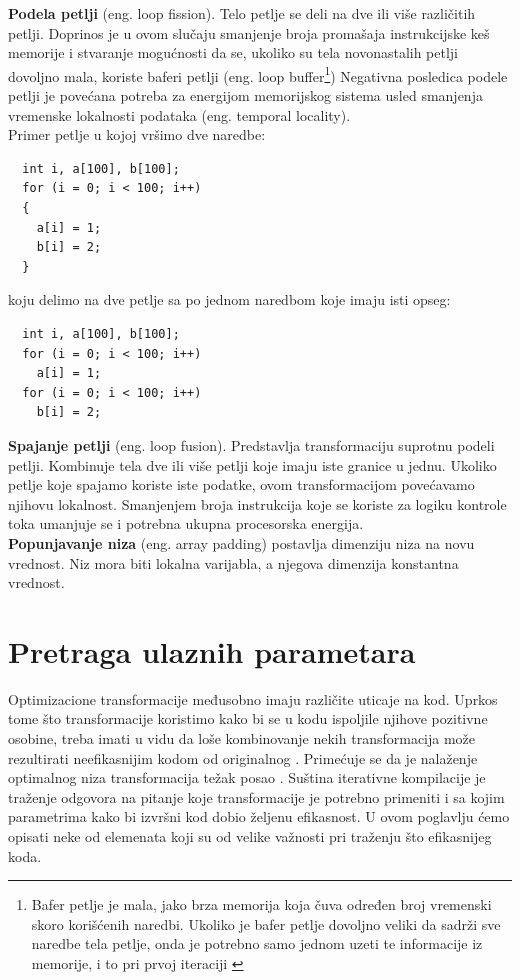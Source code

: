 \documentclass[a4paper]{article}
\begin{document}
\textbf{Podela petlji} (eng. loop fission). Telo petlje se deli na dve ili više različitih petlji. 
Doprinos je u ovom slučaju smanjenje broja promašaja instrukcijske keš memorije i stvaranje mogućnosti da se, 
ukoliko su tela novonastalih petlji dovoljno mala, 
koriste baferi petlji (eng. loop buffer\footnote{Bafer petlje je mala, jako brza memorija koja čuva određen broj vremenski skoro korišćenih naredbi. Ukoliko je bafer petlje dovoljno veliki da sadrži sve naredbe tela petlje, onda je potrebno samo jednom uzeti te informacije iz memorije, i to pri prvoj iteraciji \cite{stallings2000computer}}) Negativna posledica podele petlji je povećana potreba za energijom memorijskog sistema usled smanjenja vremenske lokalnosti podataka (eng. temporal locality).\\
Primer petlje u kojoj vršimo dve naredbe:
\begin{lstlisting}
  int i, a[100], b[100];
  for (i = 0; i < 100; i++)
  {
    a[i] = 1; 
    b[i] = 2;
  }
\end{lstlisting}
koju delimo na dve petlje sa po jednom naredbom koje imaju isti opseg:
\begin{lstlisting}
  int i, a[100], b[100];
  for (i = 0; i < 100; i++)
    a[i] = 1;                     
  for (i = 0; i < 100; i++)
    b[i] = 2;
\end{lstlisting}

\textbf{Spajanje petlji} (eng. loop fusion). Predstavlja transformaciju suprotnu podeli petlji. Kombinuje tela dve ili više petlji koje imaju iste
granice u jednu. Ukoliko petlje koje spajamo koriste iste podatke, ovom transformacijom povećavamo
njihovu lokalnost. Smanjenjem broja instrukcija koje se koriste za logiku kontrole toka umanjuje se 
i potrebna ukupna procesorska energija.\\

\textbf{Popunjavanje niza} (eng. array padding) postavlja dimenziju niza na novu vrednost. Niz mora biti lokalna varijabla, a njegova dimenzija konstantna vrednost.

\section{Pretraga ulaznih parametara}
\label{sec:pretraga}
Optimizacione transformacije međusobno imaju različite uticaje na kod. 
Uprkos tome što transformacije koristimo kako bi se u kodu ispoljile njihove pozitivne osobine, 
treba imati u vidu da loše kombinovanje nekih transformacija može rezultirati neefikasnijim kodom od originalnog \cite{Knijnenburg2002}. 
Primećuje se da je nalaženje optimalnog niza transformacija težak posao \cite{Fursin2005}. Suština iterativne kompilacije
je traženje odgovora na pitanje koje transformacije je potrebno primeniti i sa kojim parametrima kako bi 
izvršni kod dobio željenu efikasnost. U ovom poglavlju ćemo opisati neke od elemenata koji su od velike važnosti pri traženju što efikasnijeg koda.
\end{document}

